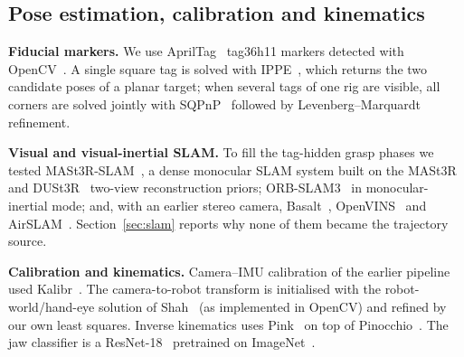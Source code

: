 \documentclass[conference,10pt]{IEEEtran}
\begin{document}
\subsection{Pose estimation, calibration and kinematics}
\textbf{Fiducial markers.} We use AprilTag~\cite{olson2011apriltag,wang2016apriltag2} tag36h11 markers detected with
OpenCV~\cite{bradski2000opencv}. A single square tag is solved with IPPE~\cite{collins2014ippe}, which returns the two
candidate poses of a planar target; when several tags of one rig are visible, all corners are solved jointly with
SQPnP~\cite{terzakis2020sqpnp} followed by Levenberg--Marquardt refinement.

\textbf{Visual and visual-inertial SLAM.} To fill the tag-hidden grasp phases we tested
MASt3R-SLAM~\cite{murai2025mast3rslam}, a dense monocular SLAM system built on the MASt3R~\cite{leroy2024mast3r} and
DUSt3R~\cite{wang2024dust3r} two-view reconstruction priors; ORB-SLAM3~\cite{campos2021orbslam3} in monocular-inertial mode;
and, with an earlier stereo camera, Basalt~\cite{usenko2020basalt}, OpenVINS~\cite{geneva2020openvins} and
AirSLAM~\cite{xu2025airslam}. Section~\ref{sec:slam} reports why none of them became the trajectory source.

\textbf{Calibration and kinematics.} Camera--IMU calibration of the earlier pipeline used Kalibr~\cite{furgale2013kalibr}.
The camera-to-robot transform is initialised with the robot-world/hand-eye solution of Shah~\cite{shah2013robotworld} (as
implemented in OpenCV) and refined by our own least squares. Inverse kinematics uses Pink~\cite{pink} on top of
Pinocchio~\cite{carpentier2019pinocchio}. The jaw classifier is a ResNet-18~\cite{he2016resnet} pretrained on
ImageNet~\cite{deng2009imagenet}.

\end{document}
